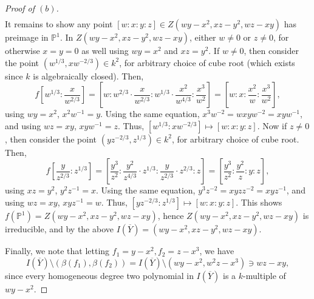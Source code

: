 \documentclass[12pt,letterpaper]{article}
\theoremstyle{definition}
\theoremstyle{remark}
\numberwithin{equation}{section}
\numberwithin{figure}{problem}
\newcommand{\PP}{\mathbb{P}}
\begin{document}
\begin{proof}[Proof of $(b)$]
\begin{gather*}
  \end{gather*}
  It remains to show any point $[w:x:y:z] \in Z(wy-x^2,xz-y^2,wz-xy)$ has
  preimage in $\mathbb{P}^1$. In $Z(wy-x^2,xz-y^2,wz-xy)$, either $w \ne 0$ or $z \ne 0$, for otherwise $x=y=0$ as well using $wy=x^2$ and $xz=y^2$. If $w \ne 0$, then consider the point $(w^{1/3},xw^{-2/3}) \in k^2$, for arbitrary choice of cube root (which exists since $k$ is algebraically closed). Then,
  \begin{equation*}
    f\left[w^{1/3}:\frac{x}{w^{2/3}}\right] = \left[ w:w^{2/3} \cdot
    \frac{x}{w^{2/3}}:w^{1/3} \cdot \frac{x^2}{w^{4/3}}:
    \frac{x^3}{w^{2}}\right] = \left[ w:x:\frac{x^2}{w}:
    \frac{x^3}{w^{2}}\right],
  \end{equation*}
  using $wy=x^2$, $x^2w^{-1} = y$. Using the same equation, $x^3w^{-2} = wxyw^{-2} = xyw^{-1}$, and using $wz=xy$, $xyw^{-1} = z$. Thus, $[w^{1/3}:xw^{-2/3}] \mapsto [w:x:y:z]$. Now if $z \ne 0$, then consider the point $(yz^{-2/3},z^{1/3}) \in k^2$, for arbitrary choice of cube root. Then,
  \begin{equation*}
    f\left[ \frac{y}{z^{2/3}}:z^{1/3} \right] = \left[ \frac{y^3}{z^2}:\frac{y^2}{z^{4/3}} \cdot z^{1/3}:\frac{y}{z^{2/3}} \cdot z^{2/3}:z \right] = \left[ \frac{y^3}{z^2}:\frac{y^2}{z}:y:z \right],
  \end{equation*}
  using $xz = y^2$, $y^2z^{-1} = x$. Using the same equation, $y^3z^{-2} =
  xyzz^{-2} = xyz^{-1}$, and using $wz = xy$, $xyz^{-1} = w$. Thus,
  $[yz^{-2/3}:z^{1/3}] \mapsto [w:x:y:z]$. This shows $f(\PP^1) =
  Z(wy-x^2,xz-y^2,wz-xy)$, hence $Z(wy-x^2,xz-y^2,wz-xy)$ is irreducible, and by
  the above $I(\overline{Y}) = (wy-x^2,xz-y^2,wz-xy)$.
  \par Finally, we note that letting $f_1 = y-x^2,f_2 = z-x^3$, we have
  \[I(\overline{Y}) \setminus (\beta(f_1),\beta(f_2)) =
    I(\overline{Y}) \setminus (wy-x^2,w^2z-x^3) \ni wz-xy,\]
  since every homogeneous degree two polynomial in $I(\overline{Y})$ is a
  $k$-multiple of $wy-x^2$.
\end{proof}
\end{document}
